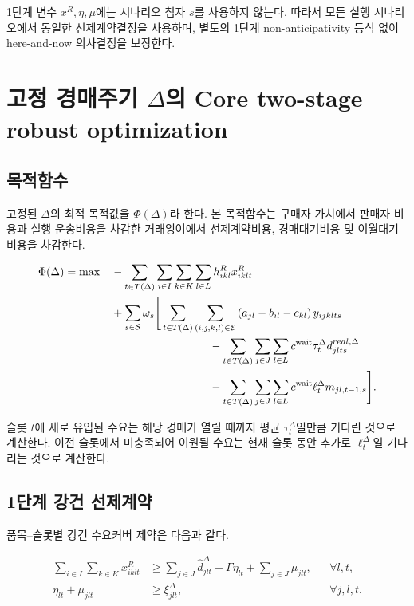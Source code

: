 \documentclass[11pt,a4paper]{article}
\newcommand{\Scen}{\mathcal S}
\newcommand{\Eset}{\mathcal E}
\begin{document}
1단계 변수 $x^R,\eta,\mu$에는 시나리오 첨자 $s$를 사용하지 않는다.
따라서 모든 실행 시나리오에서 동일한 선제계약결정을 사용하며,
별도의 1단계 non-anticipativity 등식 없이 here-and-now 의사결정을 보장한다.

\section{고정 경매주기 $\Delta$의 Core two-stage robust optimization}

\subsection{목적함수}

고정된 $\Delta$의 최적 목적값을 $\Phi(\Delta)$라 한다.
본 목적함수는 구매자 가치에서 판매자 비용과 실행 운송비용을 차감한 거래잉여에서
선제계약비용, 경매대기비용 및 이월대기비용을 차감한다.

\begin{align}
\Phi(\Delta)=\max\quad
&-\sum_{t\in T(\Delta)}
\sum_{i\in I}\sum_{k\in K}\sum_{l\in L}
h^R_{ikl}x^R_{iklt}
\nonumber\\
&+\sum_{s\in\Scen}\omega_s
\Bigg[
\sum_{t\in T(\Delta)}
\sum_{(i,j,k,l)\in\Eset}
\left(
a_{jl}-b_{il}-c_{kl}\right)y_{ijklts}
\nonumber\\
&\hspace{31mm}
-\sum_{t\in T(\Delta)}\sum_{j\in J}\sum_{l\in L}c^{\mathrm{wait}}\tau_t^\Delta d_{jlts}^{real,\Delta}
\nonumber\\
&\hspace{31mm}
-\sum_{t\in T(\Delta)}
\sum_{j\in J}\sum_{l\in L}
c^{\mathrm{wait}}\ell_t^\Delta m_{jl,t-1,s}
\Bigg].
\label{eq:obj}
\end{align}

슬롯 $t$에 새로 유입된 수요는 해당 경매가 열릴 때까지 평균 $\tau_t^\Delta$일만큼 기다린 것으로 계산한다.
이전 슬롯에서 미충족되어 이원될 수요는 현재 슬롯 동안 추가로 $\ell_t^\Delta$일 기다리는 것으로 계산한다.

\subsection{1단계 강건 선제계약}

품목--슬롯별 강건 수요커버 제약은 다음과 같다.

\begin{align}
\sum_{i\in I}\sum_{k\in K}x^R_{iklt}
&\ge
\sum_{j\in J}\hat d^\Delta_{jlt}
+\Gamma\eta_{lt}
+\sum_{j\in J}\mu_{jlt},
&&\forall l,t,
\label{eq:robust-cover}\\
\eta_{lt}+\mu_{jlt}
&\ge
\xi^\Delta_{jlt},
&&\forall j,l,t.
\label{eq:robust-dual}
\end{align}
\end{document}
